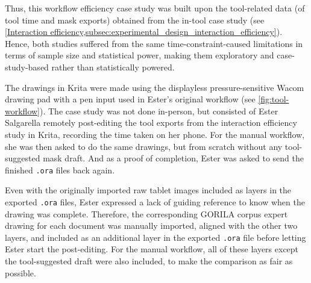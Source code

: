 Thus, this workflow efficiency case study was built upon the tool-related data (of tool time and mask exports) obtained from the in-tool case study (see \cref{Interaction efficiency,subsec:experimental_design_interaction_efficiency}).
Hence, both studies suffered from the same time-constraint-caused limitations in terms of sample size and statistical power, making them exploratory and case-study-based rather than statistically powered.

The drawings in Krita were made using the displayless pressure-sensitive Wacom drawing pad with a pen input used in Ester's original workflow (see \cref{fig:tool-workflow}).
The case study was not done in-person, but consisted of Ester Salgarella remotely post-editing the tool exports from the interaction efficiency study in Krita, recording the time taken on her phone.
For the manual workflow, she was then asked to do the same drawings, but from scratch without any tool-suggested mask draft.
And as a proof of completion, Ester was asked to send the finished \texttt{.ora} files back again.

Even with the originally imported raw tablet images included as layers in the exported \texttt{.ora} files, Ester expressed a lack of guiding reference to know when the drawing was complete.
Therefore, the corresponding \acs{GORILA} corpus expert drawing for each document was manually imported, aligned with the other two layers, and included as an additional layer in the exported \texttt{.ora} file before letting Ester start the post-editing.
For the manual workflow, all of these layers except the tool-suggested draft were also included, to make the comparison as fair as possible.


